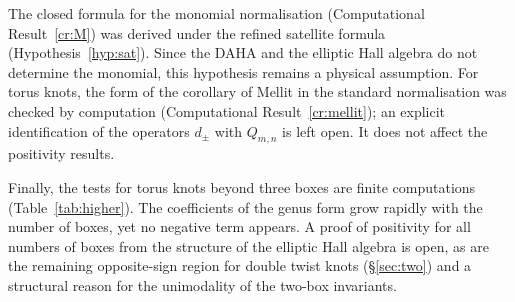The closed formula for the monomial normalisation (Computational Result~\ref{cr:M}) was derived under the refined satellite formula (Hypothesis~\ref{hyp:sat}).
Since the DAHA and the elliptic Hall algebra do not determine the monomial, this hypothesis remains a physical assumption.
For torus knots, the form of the corollary of Mellit in the standard normalisation was checked by computation (Computational Result~\ref{cr:mellit});
an explicit identification of the operators $d_\pm$ with $Q_{m,n}$ is left open. It does not affect the positivity results.

Finally, the tests for torus knots beyond three boxes are finite computations (Table~\ref{tab:higher}).
The coefficients of the genus form grow rapidly with the number of boxes, yet no negative term appears.
A proof of positivity for all numbers of boxes from the structure of the elliptic Hall algebra is open,
as are the remaining opposite-sign region for double twist knots (\S\ref{sec:two}) and a structural reason for the unimodality of the two-box invariants.
